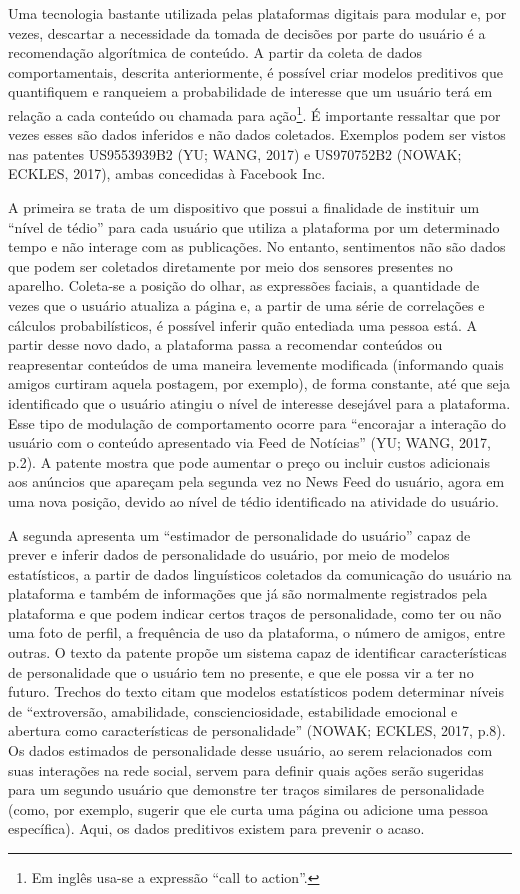 Uma tecnologia bastante utilizada pelas plataformas digitais para
modular e, por vezes, descartar a necessidade da tomada de decisões por
parte do usuário é a recomendação algorítmica de conteúdo. A partir da
coleta de dados comportamentais, descrita anteriormente, é possível
criar modelos preditivos que quantifiquem e ranqueiem a probabilidade de
interesse que um usuário terá em relação a cada conteúdo ou chamada para
ação\footnote{Em inglês usa-se a expressão ``call to action''.}. É
importante ressaltar que por vezes esses são dados inferidos e não dados
coletados. Exemplos podem ser vistos nas patentes US9553939B2 (YU; WANG,
2017) e US970752B2 (NOWAK; ECKLES, 2017), ambas concedidas à Facebook
Inc.

A primeira se trata de um dispositivo que possui a finalidade de
instituir um ``nível de tédio'' para cada usuário que utiliza a
plataforma por um determinado tempo e não interage com as publicações.
No entanto, sentimentos não são dados que podem ser coletados
diretamente por meio dos sensores presentes no aparelho. Coleta-se a
posição do olhar, as expressões faciais, a quantidade de vezes que o
usuário atualiza a página e, a partir de uma série de correlações e
cálculos probabilísticos, é possível inferir quão entediada uma pessoa
está. A partir desse novo dado, a plataforma passa a recomendar
conteúdos ou reapresentar conteúdos de uma maneira levemente modificada
(informando quais amigos curtiram aquela postagem, por exemplo), de
forma constante, até que seja identificado que o usuário atingiu o nível
de interesse desejável para a plataforma. Esse tipo de modulação de
comportamento ocorre para ``encorajar a interação do usuário com o
conteúdo apresentado via Feed de Notícias'' (YU; WANG, 2017, p.2). A
patente mostra que pode aumentar o preço ou incluir custos adicionais
aos anúncios que apareçam pela segunda vez no News Feed do usuário,
agora em uma nova posição, devido ao nível de tédio identificado na
atividade do usuário.

A segunda apresenta um ``estimador de personalidade do usuário'' capaz
de prever e inferir dados de personalidade do usuário, por meio de
modelos estatísticos, a partir de dados linguísticos coletados da
comunicação do usuário na plataforma e também de informações que já são
normalmente registrados pela plataforma e que podem indicar certos
traços de personalidade, como ter ou não uma foto de perfil, a
frequência de uso da plataforma, o número de amigos, entre outras. O
texto da patente propõe um sistema capaz de identificar características
de personalidade que o usuário tem no presente, e que ele possa vir a
ter no futuro. Trechos do texto citam que modelos estatísticos podem
determinar níveis de ``extroversão, amabilidade, conscienciosidade,
estabilidade emocional e abertura como características de
personalidade'' (NOWAK; ECKLES, 2017, p.8). Os dados estimados de
personalidade desse usuário, ao serem relacionados com suas interações
na rede social, servem para definir quais ações serão sugeridas para um
segundo usuário que demonstre ter traços similares de personalidade
(como, por exemplo, sugerir que ele curta uma página ou adicione uma
pessoa específica). Aqui, os dados preditivos existem para prevenir o
acaso.

